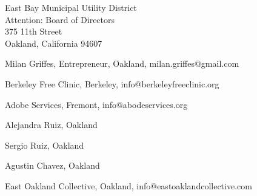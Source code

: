 \documentclass[letterpaper]{letter}
\begin{document}
\begin{letter}{%
    East Bay Municipal Utility District\\
    Attention: Board of Directors\\
    375 11th Street\\
    Oakland, California 94607}
\begin{samepage}
    Milan Griffes, Entrepreneur, Oakland, milan.griffes@gmail.com

    Berkeley Free Clinic, Berkeley, info@berkeleyfreeclinic.org

    Adobe Services, Fremont, info@abodeservices.org

    Alejandra Ruiz, Oakland

    Sergio Ruiz, Oakland

    Agustin Chavez, Oakland

    East Oakland Collective, Oakland, info@eastoaklandcollective.com
    \end{samepage}
\end{letter}
\end{document}
